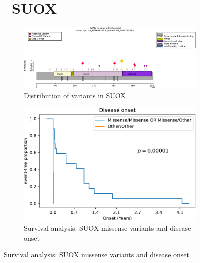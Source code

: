 \begin{figure}[htbp]
\section*{ SUOX}
\centering
\begin{subfigure}[b]{0.5\textwidth}
\centering
\includegraphics[width=\textwidth]{ img/SUOX_protein_diagram.pdf} 
\captionsetup{justification=raggedright,singlelinecheck=false}
\caption{Distribution of variants in SUOX}
\end{subfigure}
\begin{subfigure}[b]{0.45\textwidth}
\centering
\includegraphics[width=\textwidth]{ img/SUOX_stats.pdf} 
\captionsetup{justification=raggedright,singlelinecheck=false}
\caption{Survival analysis: SUOX missense variants and disease onset}
\end{subfigure}

\vspace{2em}


\end{figure}
